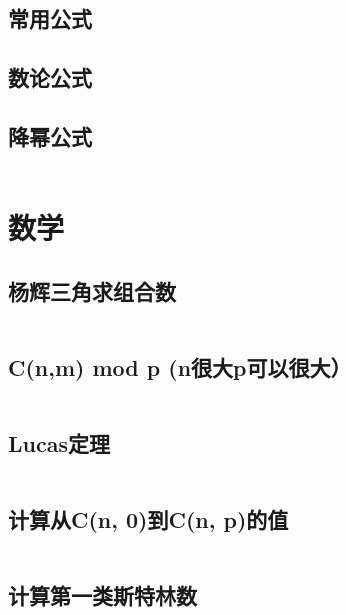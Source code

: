 \inputminted{cpp}{code/min25筛.cc}

\subsection{常用公式} 



\subsection{数论公式} 



\subsection{降幂公式} 

\inputminted{text}{code/降幂公式.txt}

\section{数学} 
\subsection{杨辉三角求组合数} 

\inputminted{cpp}{code/杨辉三角求组合数.cc}

\subsection{C(n,m) mod p (n很大p可以很大）} 

\inputminted{cpp}{code/Cnmmodp.cc}

\subsection{Lucas定理} 

\inputminted{cpp}{code/lucas.cc}

\subsection{计算从C(n, 0)到C(n, p)的值} 

\inputminted{cpp}{code/nC0tonCp.cc}

\subsection{计算第一类斯特林数} 

